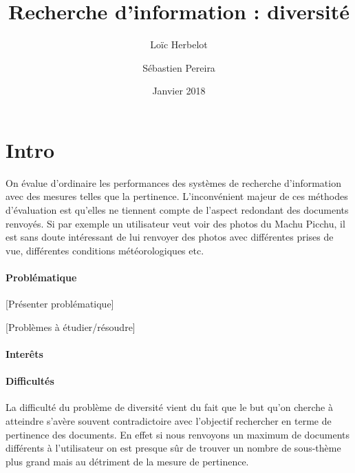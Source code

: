\documentclass{article}
\title{Recherche d'information : diversité}
\date{Janvier 2018}
\author{
   Loïc Herbelot
   \and
   Sébastien Pereira
  }
\begin{document}
\maketitle 


\tableofcontents{}




\section{Intro}
On évalue d'ordinaire les performances des systèmes de recherche d'information avec des mesures telles que la pertinence. L'inconvénient majeur de ces méthodes d'évaluation est qu'elles ne tiennent compte de l'aspect redondant des documents renvoyés. Si par exemple un utilisateur veut voir des photos du Machu Picchu, il est sans doute intéressant de lui renvoyer des photos avec différentes prises de vue, différentes conditions météorologiques etc. \\

\paragraph{Problématique}

[Présenter problématique]

[Problèmes à étudier/résoudre]

\paragraph{Interêts}

\paragraph{Difficultés}
La difficulté du problème de diversité vient du fait que le but qu'on cherche à atteindre s'avère souvent contradictoire avec l'objectif rechercher en terme de pertinence des documents. En effet si nous renvoyons un maximum de documents différents à l'utilisateur on est presque sûr de trouver un nombre de sous-thème plus grand mais au détriment de la mesure de pertinence.
\end{document}
